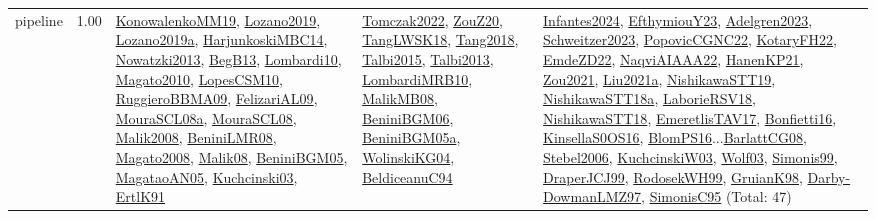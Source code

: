 {\begin{longtable}{p{3cm}r>{\raggedright\arraybackslash}p{6cm}>{\raggedright\arraybackslash}p{6cm}>{\raggedright\arraybackslash}p{8cm}}
\index{pipeline}\index{ApplicationAreas!pipeline}pipeline &  1.00 & \hyperref[detail:KonowalenkoMM19]{KonowalenkoMM19}, \hyperref[detail:Lozano2019]{Lozano2019}, \hyperref[detail:Lozano2019a]{Lozano2019a}, \hyperref[detail:HarjunkoskiMBC14]{HarjunkoskiMBC14}, \hyperref[detail:Nowatzki2013]{Nowatzki2013}, \hyperref[detail:BegB13]{BegB13}, \hyperref[detail:Lombardi10]{Lombardi10}, \hyperref[detail:Magato2010]{Magato2010}, \hyperref[detail:LopesCSM10]{LopesCSM10}, \hyperref[detail:RuggieroBBMA09]{RuggieroBBMA09}, \hyperref[detail:FelizariAL09]{FelizariAL09}, \hyperref[detail:MouraSCL08a]{MouraSCL08a}, \hyperref[detail:MouraSCL08]{MouraSCL08}, \hyperref[detail:Malik2008]{Malik2008}, \hyperref[detail:BeniniLMR08]{BeniniLMR08}, \hyperref[detail:Magato2008]{Magato2008}, \hyperref[detail:Malik08]{Malik08}, \hyperref[detail:BeniniBGM05]{BeniniBGM05}, \hyperref[detail:MagataoAN05]{MagataoAN05}, \hyperref[detail:Kuchcinski03]{Kuchcinski03}, \hyperref[detail:ErtlK91]{ErtlK91} & \hyperref[detail:Tomczak2022]{Tomczak2022}, \hyperref[detail:ZouZ20]{ZouZ20}, \hyperref[detail:TangLWSK18]{TangLWSK18}, \hyperref[detail:Tang2018]{Tang2018}, \hyperref[detail:Talbi2015]{Talbi2015}, \hyperref[detail:Talbi2013]{Talbi2013}, \hyperref[detail:LombardiMRB10]{LombardiMRB10}, \hyperref[detail:MalikMB08]{MalikMB08}, \hyperref[detail:BeniniBGM06]{BeniniBGM06}, \hyperref[detail:BeniniBGM05a]{BeniniBGM05a}, \hyperref[detail:WolinskiKG04]{WolinskiKG04}, \hyperref[detail:BeldiceanuC94]{BeldiceanuC94} & \hyperref[detail:Infantes2024]{Infantes2024}, \hyperref[detail:EfthymiouY23]{EfthymiouY23}, \hyperref[detail:Adelgren2023]{Adelgren2023}, \hyperref[detail:Schweitzer2023]{Schweitzer2023}, \hyperref[detail:PopovicCGNC22]{PopovicCGNC22}, \hyperref[detail:KotaryFH22]{KotaryFH22}, \hyperref[detail:EmdeZD22]{EmdeZD22}, \hyperref[detail:NaqviAIAAA22]{NaqviAIAAA22}, \hyperref[detail:HanenKP21]{HanenKP21}, \hyperref[detail:Zou2021]{Zou2021}, \hyperref[detail:Liu2021a]{Liu2021a}, \hyperref[detail:NishikawaSTT19]{NishikawaSTT19}, \hyperref[detail:NishikawaSTT18a]{NishikawaSTT18a}, \hyperref[detail:LaborieRSV18]{LaborieRSV18}, \hyperref[detail:NishikawaSTT18]{NishikawaSTT18}, \hyperref[detail:EmeretlisTAV17]{EmeretlisTAV17}, \hyperref[detail:Bonfietti16]{Bonfietti16}, \hyperref[detail:KinsellaS0OS16]{KinsellaS0OS16}, \hyperref[detail:BlomPS16]{BlomPS16}...\hyperref[detail:BarlattCG08]{BarlattCG08}, \hyperref[detail:Stebel2006]{Stebel2006}, \hyperref[detail:KuchcinskiW03]{KuchcinskiW03}, \hyperref[detail:Wolf03]{Wolf03}, \hyperref[detail:Simonis99]{Simonis99}, \hyperref[detail:DraperJCJ99]{DraperJCJ99}, \hyperref[detail:RodosekWH99]{RodosekWH99}, \hyperref[detail:GruianK98]{GruianK98}, \hyperref[detail:Darby-DowmanLMZ97]{Darby-DowmanLMZ97}, \hyperref[detail:SimonisC95]{SimonisC95} (Total: 47)\\

\end{longtable}}
